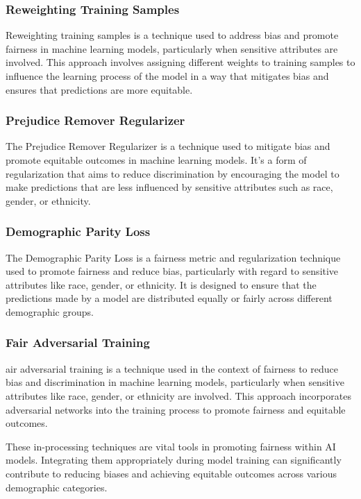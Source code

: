 \documentclass[12pt,a4paper,openright,twoside]{book}
\begin{document}
\subsubsection{Reweighting Training Samples}
Reweighting training samples is a technique used to address bias and promote fairness in machine learning models, particularly when sensitive attributes are involved. This approach involves assigning different weights to training samples to influence the learning process of the model in a way that mitigates bias and ensures that predictions are more equitable. \cite{10.1145/3178876.3186133}

\subsubsection{Prejudice Remover Regularizer}
The Prejudice Remover Regularizer is a technique used to mitigate bias and promote equitable outcomes in machine learning models. It's a form of regularization that aims to reduce discrimination by encouraging the model to make predictions that are less influenced by sensitive attributes such as race, gender, or ethnicity. \cite{10.1007/978-3-642-33486-3_3}

\subsubsection{Demographic Parity Loss}
The Demographic Parity Loss is a fairness metric and regularization technique used to promote fairness and reduce bias, particularly with regard to sensitive attributes like race, gender, or ethnicity. It is designed to ensure that the predictions made by a model are distributed equally or fairly across different demographic groups. \cite{jiang2022generalized}

\subsubsection{Fair Adversarial Training}
air adversarial training is a technique used in the context of fairness to reduce bias and discrimination in machine learning models, particularly when sensitive attributes like race, gender, or ethnicity are involved. This approach incorporates adversarial networks into the training process to promote fairness and equitable outcomes. \cite{pmlr-v139-xu21b}

These in-processing techniques are vital tools in promoting fairness within AI models. Integrating them appropriately during model training can significantly contribute to reducing biases and achieving equitable outcomes across various demographic categories.
\end{document}
